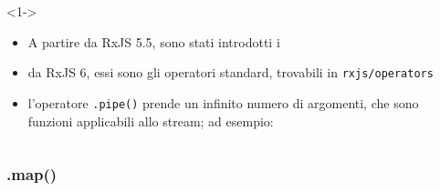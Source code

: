             \begin{frame}{\insertsubsectionhead}{}
                \begin{block}{\texttt{\insertsubsubsectionhead}}<1->
                    \begin{itemize}
                        \item
                            A partire da RxJS 5.5, sono stati introdotti i 
                        \item
                            da RxJS 6, essi sono gli operatori standard, trovabili in \texttt{rxjs/operators}
                        \item
                            l'operatore \texttt{.pipe()} prende un infinito numero di argomenti, che sono funzioni applicabili allo stream; ad esempio:
                    \end{itemize}
                \end{block}
                \inputminted{js}{src/pipe.js}
                 {
                }
            \end{frame}

            \subsubsection{.map()}\label{subsub:map}


